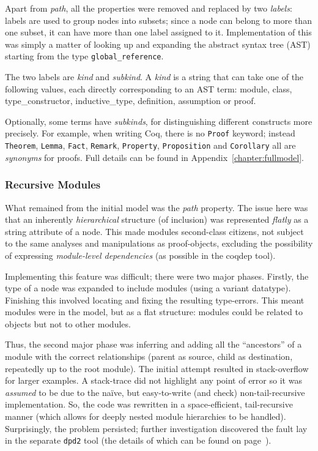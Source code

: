 Apart from \emph{path}, all the properties were removed and replaced by two
\emph{labels}: labels are used to group  nodes into subsets; since a node can
belong to more than one subset, it can have more than one label assigned to it.
Implementation of this was simply a matter of looking up and expanding the
abstract syntax tree (AST) starting from the type \texttt{global\_reference}.

The two labels are \emph{kind} and \emph{subkind}.  A \emph{kind} is a string
that can take one of the following values, each directly corresponding to an
AST term: \textsf{module}, \textsf{class}, \textsf{type\_constructor},
\textsf{inductive\_type}, \textsf{definition}, \textsf{assumption} or
\textsf{proof}.

Optionally, some terms have \emph{subkinds}, for distinguishing different
constructs more precisely. For example, when writing Coq, there is no
\texttt{Proof} keyword; instead \texttt{Theorem}, \texttt{Lemma}, \texttt{Fact},
\texttt{Remark}, \texttt{Property}, \texttt{Proposition} and \texttt{Corollary}
all are \emph{synonyms} for proofs. Full details can be found in
Appendix~\ref{chapter:fullmodel}.

\subsubsection{Recursive Modules}\label{subsubsec:recmodules}

What remained from the initial model was the \emph{path} property. The issue
here was that an inherently \emph{hierarchical} structure (of inclusion) was
represented \emph{flatly} as a string attribute of a node. This made modules
second-class citizens, not subject to the same analyses and manipulations as
proof-objects, excluding the possibility of expressing \emph{module-level
dependencies} (as possible in the coqdep tool).

Implementing this feature was difficult; there were two major phases. Firstly,
the type of a node was expanded to include modules (using a variant datatype).
Finishing this involved locating and fixing the resulting type-errors. This
meant modules were in the model, but as a flat structure: modules could be
related to objects but not to other modules.

Thus, the second major phase was inferring and adding all the ``ancestors'' of
a module with the correct relationships (parent as source, child as
destination, repeatedly up to the root module). The initial attempt resulted in
stack-overflow for larger examples. A stack-trace did not highlight any point
of error so it was \emph{assumed} to be due to the na\"{i}ve, but easy-to-write
(and check) non-tail-recursive implementation. So, the code was rewritten in a
space-efficient, tail-recursive manner (which allows for deeply nested module
hierarchies to be handled). Surprisingly, the problem persisted; further
investigation discovered the fault lay in the separate \texttt{dpd2} tool (the
details of which can be found on page~\pageref{subsubsec:dpd2}).

